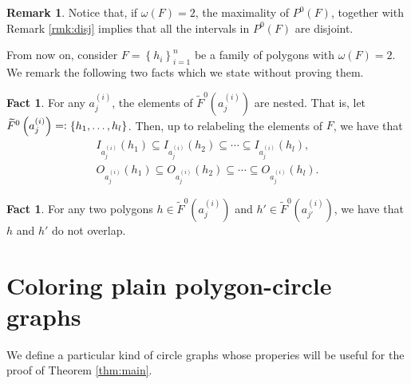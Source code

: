 \documentclass[12pt]{article}
\theoremstyle{definition}
\newtheorem{rmk}[thm]{Remark}
\newtheorem{fact}[thm]{Fact}
\newcommand{\eqdef}{=\vcentcolon}
\begin{document}
     \begin{rmk}
         Notice that, if 
         $\omega\left(F\right) = 2$,
         the maximality of
         $P^{0}\left(F\right)$,
         together with 
         Remark \ref{rmk:disj}
         implies that all the
         intervals in $P^{0}\left(F\right)$
         are disjoint.
     \end{rmk}

     From now on, consider
     $F = \left\{h_{i}\right\}_{i = 1}^{n}$ 
     be a family of polygons
     with $\omega\left(F\right)=2$.
     We remark the following
     two facts which we 
     state without proving them.

     \begin{fact} \label{fact:single}
         For any $a_{j}^{\left(i\right)}$,
         the elements of
         $\widetilde{F}^{0}\left(a_{j}^{\left(i\right)}\right)$ 
         are nested. That is, let
             $\widetilde{F}^{0}\left(a_{j}^{\left(i\right)}\right) 
             \eqdef \left\{h_1, \ldots, h_{l}\right\}$.
         Then, up to relabeling
         the elements of $F$, we have that
         \begin{gather*}
             I_{a_{j}^{\left(i\right)}}\left(h_1\right)
             \subseteq I_{a_{j}^{\left(i\right)}}\left(h_2\right)
             \subseteq \cdots
             \subseteq I_{a_{j}^{\left(i\right)}}\left(h_{l}\right), \\
             O_{a_{j}^{\left(i\right)}}\left(h_1\right)
             \subseteq O_{a_{j}^{\left(i\right)}}\left(h_2\right)
             \subseteq \cdots
             \subseteq O_{a_{j}^{\left(i\right)}}\left(h_{l}\right).
         \end{gather*}
     \end{fact}
     
     \begin{fact} \label{fact:double}
         For any two polygons
         $h \in \widetilde{F}^{0}\left(a_{j}^{\left(i\right)}\right)$ 
         and 
         $h' \in \widetilde{F}^{0}\left(a_{j'}^{\left(i\right)}\right)$, 
         we have that $h$ and $h'$
         do not overlap.    
     \end{fact}

     \section{Coloring plain polygon-circle graphs}

     We define a particular
     kind of circle graphs
     whose properies
     will be useful for the
     proof of Theorem \ref{thm:main}.
\end{document}
